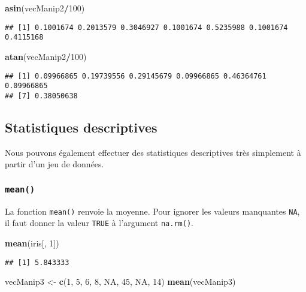 \documentclass[]{book}
\newenvironment{Shaded}{\begin{snugshade}}{\end{snugshade}}
\newcommand{\KeywordTok}[1]{\textcolor[rgb]{0.13,0.29,0.53}{\textbf{#1}}}
\newcommand{\DecValTok}[1]{\textcolor[rgb]{0.00,0.00,0.81}{#1}}
\newcommand{\StringTok}[1]{\textcolor[rgb]{0.31,0.60,0.02}{#1}}
\newcommand{\OtherTok}[1]{\textcolor[rgb]{0.56,0.35,0.01}{#1}}
\newcommand{\OperatorTok}[1]{\textcolor[rgb]{0.81,0.36,0.00}{\textbf{#1}}}
\newcommand{\NormalTok}[1]{#1}
\theoremstyle{definition}
\theoremstyle{definition}
\theoremstyle{definition}
\theoremstyle{remark}
\begin{document}
\begin{Shaded}
\begin{Highlighting}[]
\KeywordTok{asin}\NormalTok{(vecManip2}\OperatorTok{/}\DecValTok{100}\NormalTok{)}
\end{Highlighting}
\end{Shaded}

\begin{verbatim}
## [1] 0.1001674 0.2013579 0.3046927 0.1001674 0.5235988 0.1001674 0.4115168
\end{verbatim}

\begin{Shaded}
\begin{Highlighting}[]
\KeywordTok{atan}\NormalTok{(vecManip2}\OperatorTok{/}\DecValTok{100}\NormalTok{)}
\end{Highlighting}
\end{Shaded}

\begin{verbatim}
## [1] 0.09966865 0.19739556 0.29145679 0.09966865 0.46364761 0.09966865
## [7] 0.38050638
\end{verbatim}

\subsection{Statistiques descriptives}\label{statistiques-descriptives}

Nous pouvons également effectuer des statistiques descriptives très
simplement à partir d'un jeu de données.

\subsubsection{\texorpdfstring{\texttt{mean()}}{mean()}}\label{l015mean}

La fonction \texttt{mean()} renvoie la moyenne. Pour ignorer les valeurs
manquantes \texttt{NA}, il faut donner la valeur \texttt{TRUE} à
l'argument \texttt{na.rm()}.

\begin{Shaded}
\begin{Highlighting}[]
\KeywordTok{mean}\NormalTok{(iris[, }\DecValTok{1}\NormalTok{])}
\end{Highlighting}
\end{Shaded}

\begin{verbatim}
## [1] 5.843333
\end{verbatim}

\begin{Shaded}
\begin{Highlighting}[]
\NormalTok{vecManip3 <-}\StringTok{ }\KeywordTok{c}\NormalTok{(}\DecValTok{1}\NormalTok{, }\DecValTok{5}\NormalTok{, }\DecValTok{6}\NormalTok{, }\DecValTok{8}\NormalTok{, }\OtherTok{NA}\NormalTok{, }\DecValTok{45}\NormalTok{, }\OtherTok{NA}\NormalTok{, }\DecValTok{14}\NormalTok{)}
\KeywordTok{mean}\NormalTok{(vecManip3)}
\end{Highlighting}
\end{Shaded}
\end{document}
